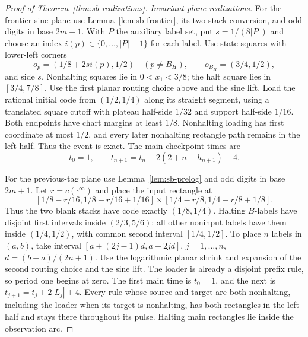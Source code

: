 \begin{proof}[Proof of Theorem~\ref{thm:sb-realizations}]
\emph{Invariant-plane realizations.}
For the frontier sine plane use Lemma~\ref{lem:sb-frontier}, its two-stack conversion, and odd digits in base $2m+1$.  With $P$ the auxiliary label set, put $s=1/(8|P|)$ and choose an index $i(p)\in\{0,\ldots,|P|-1\}$ for each label.  Use state squares with lower-left corners
\[
 o_p=(1/8+2s i(p),1/2)\quad(p\ne B_H),\qquad
 o_{B_H}=(3/4,1/2),
\]
and side $s$.  Nonhalting squares lie in $0<x_1<3/8$; the halt square lies in $[3/4,7/8]$.  Use the first planar routing choice above and the sine lift.  Load the rational initial code from $(1/2,1/4)$ along its straight segment, using a translated square cutoff with plateau half-side $1/32$ and support half-side $1/16$.  Both endpoints have chart margins at least $1/8$.  Nonhalting loading has first coordinate at most $1/2$, and every later nonhalting rectangle path remains in the left half.  Thus the event is exact.  The main checkpoint times are
\[
 t_0=1,\qquad t_{n+1}=t_n+2(2+n-h_{n+1})+4.
\]

For the previous-tag plane use Lemma~\ref{lem:sb-prelog} and odd digits in base $2m+1$.  Let $r=c(\square^\infty)$ and place the input rectangle at
\[
 [1/8-r/16,1/8-r/16+1/16]\times
 [1/4-r/8,1/4-r/8+1/8].
\]
Thus the two blank stacks have code exactly $(1/8,1/4)$.  Halting $B$-labels have disjoint first intervals inside $(2/3,5/6)$; all other noninput labels have them inside $(1/4,1/2)$, with common second interval $[1/4,1/2]$.  To place $n$ labels in $(a,b)$, take interval $[a+(2j-1)d,a+2jd]$, $j=1,\ldots,n$, $d=(b-a)/(2n+1)$.  Use the logarithmic planar shrink and expansion of the second routing choice and the sine lift.  The loader is already a disjoint prefix rule, so period one begins at zero.  The first main time is $t_0=1$, and the next is $t_{j+1}=t_j+2|L_j|+4$.  Every rule whose source and target are both nonhalting, including the loader when its target is nonhalting, has both rectangles in the left half and stays there throughout its pulse.  Halting main rectangles lie inside the observation arc.


\end{proof}

